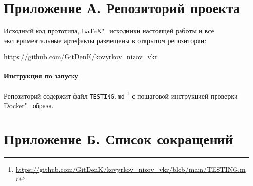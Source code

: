 \appendix

\section*{Приложение А. Репозиторий проекта}

Исходный код прототипа, \LaTeX"=исходники настоящей работы и все
экспериментальные артефакты размещены в открытом репозитории:

\begin{center}
    \url{https://github.com/GitDenK/kovyrkov_nizov_vkr}
\end{center}

\paragraph{Инструкция по запуску.}
Репозиторий содержит файл \texttt{TESTING.md}%
\footnote{\url{https://github.com/GitDenK/kovyrkov_nizov_vkr/blob/main/TESTING.md}}
с пошаговой инструкцией проверки Docker"=образа. 

\newpage

\section*{Приложение Б. Список сокращений}

